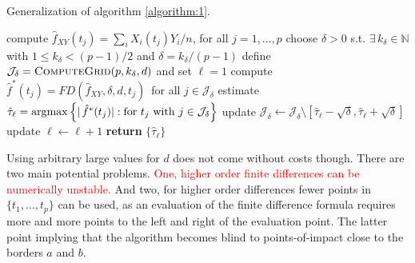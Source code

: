 \begin{tcolorbox}[standard jigsaw, opacityback=0]

\begin{algorithm}[H]
\caption{Generalization of algorithm \ref{algorithm:1}.}
\label{algorithm:2}

\begin{algorithmic}[1]
  \State compute $\hat{f}_{XY}(t_j) = \sum_i X_i(t_j) Y_i / n$, for all $j=1,\dots,p$
  \State choose $\delta > 0$ s.t. $\exists \, k_{\delta} \in \mathbb{N}$ with $1 \leq
  k_{\delta} < (p - 1)/2$ and $\delta = k_{\delta} / (p-1)$
  \State define $\mathcal{J}_{\delta} = \Call{ComputeGrid}{p, k_{\delta}, d}$ and set
  $\ell = 1$
  \State compute $\hat{f}^\ast(t_j) = FD(\hat{f}_{XY}, \delta, d, t_j) \,$ for all
  $j \in \mathcal{J}_{\delta}$
  \State estimate $\hat{\tau}_{\ell} = \operatorname*{argmax} \left\{|\,\hat{f}^\ast(t_j)| : \text{for
    } t_j \text{ with } j \in \mathcal{J}_{\delta}\right\}$
    \State update $\mathcal{J}_{\delta} \leftarrow \mathcal{J}_{\delta} \setminus
    [\hat{\tau}_{\ell} - \sqrt{\delta}, \hat{\tau}_{\ell} + \sqrt{\delta}]$
    \State update $\ell \leftarrow \ell + 1$
  \EndWhile
  \State \textbf{return} $\{\hat{\tau}_{\ell}\}$
\end{algorithmic}
\end{algorithm}

\end{tcolorbox}

Using arbitrary large values for $d$ does not come without costs though. There are two
main potential problems. \textcolor{red}{One, higher order finite differences can be
numerically unstable.} And two, for higher order differences fewer points in $\{t_1,
\dots, t_p\}$ can be used, as an evaluation of the finite difference formula requires
more and more points to the left and right of the evaluation point. The latter point
implying that the algorithm becomes blind to points-of-impact close to the borders $a$
and $b$.
